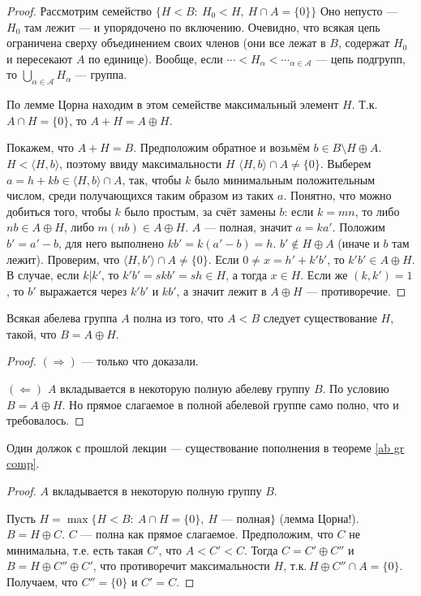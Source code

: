 \documentclass[10pt,a4paper]{article}%
\begin{document}
\begin{proof} Рассмотрим семейство $\{H<B:~H_0<H,~H\cap A=\{0\}\}$ Оно
непусто --- $H_0$ там лежит
--- и упорядочено по включению. Очевидно, что всякая цепь
ограничена сверху объединением своих членов (они все лежат в $B$,
содержат $H_0$ и пересекают $A$ по единице). Вообще, если
$\cdots<H_\alpha<\cdots_{\alpha\in\mathcal{A}}$ --- цепь подгрупп,
то $\bigcup\limits_{\alpha\in\mathcal{A}}H_\alpha$ --- группа.

По лемме Цорна находим в этом семействе максимальный элемент $H$.
Т.к.\, $A\cap H=\{0\}$, то $A+H=A\oplus H$.

Покажем, что $A+H=B$. Предположим обратное и возьмём $b\in
B\setminus H\oplus A$. $H<\langle H,b\rangle$, поэтому ввиду
максимальности $H$ $\langle H,b\rangle\cap A\ne\{0\}$. Выберем
$a=h+kb\in\langle H,b\rangle\cap A$, так, чтобы $k$ было
минимальным положительным числом, среди получающихся таким образом
из таких $a$. Понятно, что можно добиться того, чтобы $k$ было
простым, за счёт замены $b$: если $k=mn$, то либо $nb\in A\oplus
H$, либо $m(nb)\in A\oplus H$. $A$ --- полная, значит $a=ka'$.
Положим $b'=a'-b$, для него выполнено $kb'=k(a'-b)=h$. $b'\notin
H\oplus A$ (иначе и $b$ там лежит). Проверим, что $\langle
H,b'\rangle\cap A\ne\{0\}$. Если $0\ne x=h'+k'b'$, то $k'b'\in
A\oplus H$. В случае, если $k|k'$, то $k'b'=skb'=sh\in H$, а тогда
$x\in H$. Если же $(k,k')=1$, то $b'$ выражается через $k'b'$ и
$kb'$, а значит лежит в $A\oplus H$ --- противоречие.\end{proof}

\begin{theorem}Всякая абелева группа $A$ полна \ifif из того, что
$A<B$ следует существование $H$, такой, что $B=A\oplus H$.
\end{theorem}

\begin{proof} $(\Rightarrow)$ --- только что доказали.

$(\Leftarrow)$ $A$ вкладывается в некоторую полную абелеву группу
$B$. По условию $B=A\oplus H$. Но прямое слагаемое в полной
абелевой группе само полно, что и требовалось.\end{proof}

Один должок с прошлой лекции --- существование пополнения в
теореме \ref{ab gr comp}.

\begin{proof} $A$ вкладывается в некоторую полную группу $B$.

Пусть $H=\max\{H<B:~A\cap H=\{0\},~H\mbox{ --- полная}\}$ (лемма
Цорна!). $B=H\oplus C$. $C$ --- полна как прямое слагаемое.
Предположим, что $C$ не минимальна, т.е. есть такая $C'$, что
$A<C'<C$. Тогда $C=C'\oplus C''$ и $B=H\oplus C''\oplus C'$, что
противоречит максимальности $H$, т.к.\,$H\oplus C''\cap A=\{0\}$.
Получаем, что $C''=\{0\}$ и $C'=C$.\end{proof}
\end{document}
